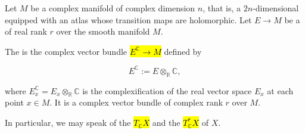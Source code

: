 \begin{definition} \label{definition:complexification_of_a_real_vector_bundle_over_a_complex_manifold}

Let $M$ be a complex manifold of complex dimension $n$, that is, a  $2n$-dimensional  equipped with an atlas whose transition maps are holomorphic. Let $E \to M$ be a  of real rank $r$ over the smooth manifold $M$.

The  is the complex vector bundle \hl{$E^\mathbb{C} \to M$} defined by

$$ E^\mathbb{C} := E \otimes_{\mathbb{R}} \mathbb{C}, $$

where $E^\mathbb{C}_x = E_x \otimes_{\mathbb{R}} \mathbb{C}$ is the complexification of the real vector space $E_x$ at each point $x \in M$. It is a complex vector bundle of complex rank $r$ over $M$.

In particular, we may speak of the  \hl{$T_{\mathbb{C}}X$} and the  \hl{$T_{\mathbb{C}}^* X$} of $X$.

\end{definition}
